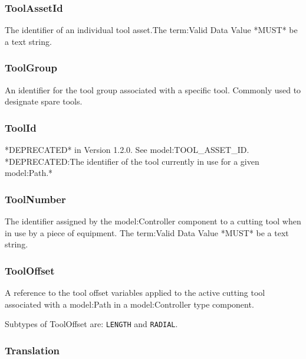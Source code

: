 \subsubsection{ToolAssetId}
  \label{sec:ToolAssetId}


The identifier of an individual tool asset.The {term:Valid Data Value} *MUST* be a text string.

\FloatBarrier

\subsubsection{ToolGroup}
  \label{sec:ToolGroup}


An identifier for the tool group associated with a specific tool. Commonly used to designate spare tools.

\FloatBarrier

\subsubsection{ToolId}
  \label{sec:ToolId}


*DEPRECATED* in Version 1.2.0.   See {model:TOOL_ASSET_ID}. *DEPRECATED:The identifier of the tool currently in use for a given {model:Path}.*

\FloatBarrier

\subsubsection{ToolNumber}
  \label{sec:ToolNumber}


The identifier assigned by the {model:Controller} component to a cutting tool when in use by a piece of equipment. 
 The {term:Valid Data Value} *MUST* be a text string.

\FloatBarrier

\subsubsection{ToolOffset}
  \label{sec:ToolOffset}


A reference to the tool offset variables applied to the active cutting tool associated with a {model:Path} in a {model:Controller} type component.


Subtypes of ToolOffset are: \texttt{LENGTH} and \texttt{RADIAL}. 
\FloatBarrier

\subsubsection{Translation}
  \label{sec:Translation}


